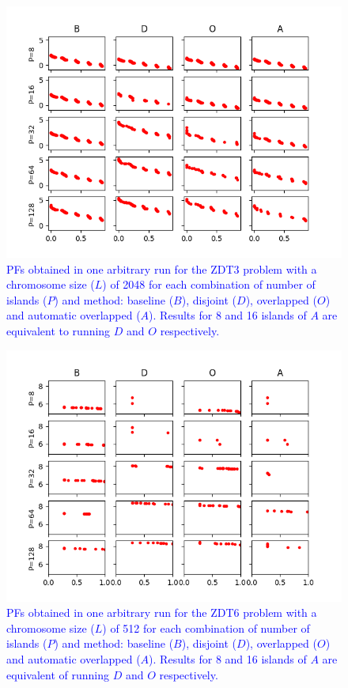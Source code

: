 \documentclass[preprint]{elsarticle}
\begin{document}
\begin{figure}
\centering
\includegraphics[width=12cm]{plot_zdt3_2048.png}
\caption{\textcolor{blue}{PFs obtained in one arbitrary run for the
    ZDT3 problem with a chromosome size ($L$) of 2048 for each
    combination of number of islands ($P$) and method: baseline ($B$),
    disjoint ($D$), overlapped ($O$) and automatic overlapped
    ($A$). Results for 8 and 16 islands of $A$ are equivalent to
    running $D$ and $O$ respectively. }}
\label{fig:plot_zdt3_2048}
\end{figure}




\begin{figure}
\centering
\includegraphics[width=12cm]{plot_zdt6_512.png}
\caption{\textcolor{blue}{PFs obtained in one arbitrary run for the ZDT6 problem with a chromosome size ($L$) of 512 for each combination of number of islands ($P$) and method: baseline ($B$), disjoint ($D$), overlapped ($O$) and automatic overlapped ($A$). Results for 8 and 16 islands of $A$ are equivalent of running $D$ and $O$ respectively. }}
\label{fig:plot_zdt6_512}
\end{figure}
\end{document}

